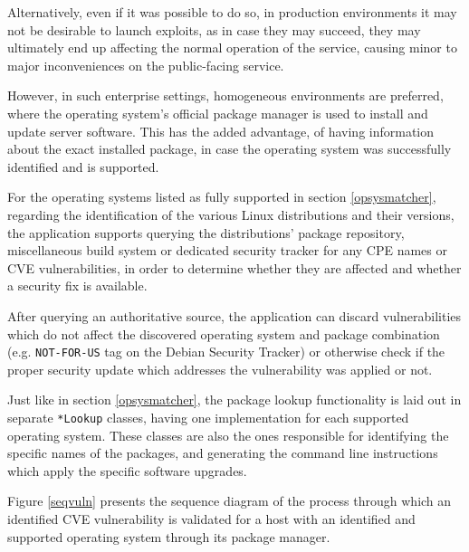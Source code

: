 \documentclass[a4paper,12pt]{article}
\begin{document}
	Alternatively, even if it was possible to do so, in production environments it may not be desirable to launch exploits, as in case they may succeed, they may ultimately end up affecting the normal operation of the service, causing minor to major inconveniences on the public-facing service.
	
	However, in such enterprise settings, homogeneous environments are preferred, where the operating system's official package manager is used to install and update server software. This has the added advantage, of having information about the exact installed package, in case the operating system was successfully identified and is supported.
	
	For the operating systems listed as fully supported in section \ref{opsysmatcher}, regarding the identification of the various Linux distributions and their versions, the application supports querying the distributions' package repository, miscellaneous build system or dedicated security tracker for any CPE names or CVE vulnerabilities, in order to determine whether they are affected and whether a security fix is available.
	
	After querying an authoritative source, the application can discard vulnerabilities which do not affect the discovered operating system and package combination (e.g. \texttt{NOT-FOR-US} tag on the Debian Security Tracker) or otherwise check if the proper security update which addresses the vulnerability was applied or not.
	
	Just like in section \ref{opsysmatcher}, the package lookup functionality is laid out in separate \texttt{*Lookup} classes, having one implementation for each supported operating system. These classes are also the ones responsible for identifying the specific names of the packages, and generating the command line instructions which apply the specific software upgrades.
	
	Figure \ref{seqvuln} presents the sequence diagram of the process through which an identified CVE vulnerability is validated for a host with an identified and supported operating system through its package manager.
	
\end{document}
